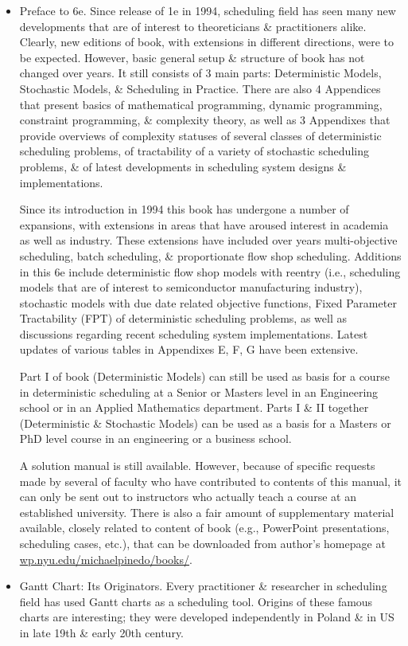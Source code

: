 \documentclass{article}
\begin{document}
\begin{itemize}
    \item {\sf Preface to 6e.} Since release of 1e in 1994, scheduling field has seen many new developments that are of interest to theoreticians \& practitioners alike. Clearly, new editions of book, with extensions in different directions, were to be expected. However, basic general setup \& structure of book has not changed over years. It still consists of 3 main parts: Deterministic Models, Stochastic Models, \& Scheduling in Practice. There are also 4 Appendices that present basics of mathematical programming, dynamic programming, constraint programming, \& complexity theory, as well as 3 Appendixes that provide overviews of complexity statuses of several classes of deterministic scheduling problems, of tractability of a variety of stochastic scheduling problems, \& of latest developments in scheduling system designs \& implementations.
    
    Since its introduction in 1994 this book has undergone a number of expansions, with extensions in areas that have aroused interest in academia as well as industry. These extensions have included over years multi-objective scheduling, batch scheduling, \& proportionate flow shop scheduling. Additions in this 6e include deterministic flow shop models with reentry (i.e., scheduling models that are of interest to semiconductor manufacturing industry), stochastic models with due date related objective functions, Fixed Parameter Tractability (FPT) of deterministic scheduling problems, as well as discussions regarding recent scheduling system implementations. Latest updates of various tables in Appendixes E, F, G have been extensive.
    
    Part I of book (Deterministic Models) can still be used as basis for a course in deterministic scheduling at a Senior or Masters level in an Engineering school or in an Applied Mathematics department. Parts I \& II together (Deterministic \& Stochastic Models) can be used as a basis for a Masters or PhD level course in an engineering or a business school.
    
    A solution manual is still available. However, because of specific requests made by several of faculty who have contributed to contents of this manual, it can only be sent out to instructors who actually teach a course at an established university. There is also a fair amount of supplementary material available, closely related to content of book (e.g., PowerPoint presentations, scheduling cases, etc.), that can be downloaded from author's homepage at \url{wp.nyu.edu/michaelpinedo/books/}.
    \item {\sf Gantt Chart: Its Originators.} Every practitioner \& researcher in scheduling field has used Gantt charts as a scheduling tool. Origins of these famous charts are interesting; they were developed independently in Poland \& in US in late 19th \& early 20th century.
    

\end{itemize}
\end{document}
